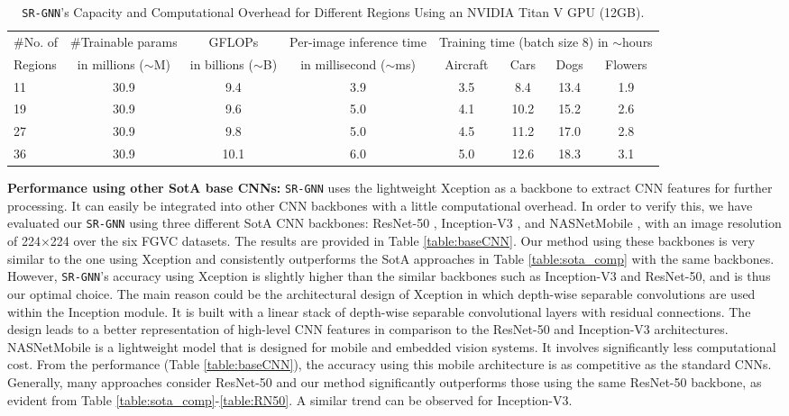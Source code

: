 \documentclass[journal]{IEEEtran}
\begin{document}
\begin{table*}[h]
\begin{center}
\caption{\texttt{SR-GNN}'s Capacity and Computational Overhead for Different Regions Using an NVIDIA Titan V GPU (12GB). }  
\label{table:time}
\begin{tabular}{|l |c |c |c |c |c |c |c|}
 \hline
\#No. of &\#Trainable params &GFLOPs &Per-image inference time  &\multicolumn{4}{|c|}{Training time (batch size 8) in $\sim$hours}\\
    \cline{5-8}
    Regions &in millions ($\sim$M) &in billions ($\sim$B) &in millisecond ($\sim$ms) &Aircraft &Cars &Dogs &Flowers \\
    \toprule
    11 &30.9 &9.4 &3.9 &3.5 &8.4 &13.4 &1.9\\
    19 &30.9 &9.6 &5.0 &4.1 &10.2 &15.2 &2.6\\
    27 &30.9 &9.8 &5.0 &4.5 &11.2 &17.0 &2.8\\
    36 &30.9 &10.1 &6.0 &5.0 &12.6 &18.3 &3.1\\
   \bottomrule
\end{tabular}
 \end{center}
 \vspace{- 0.5 cm}
\end{table*}

\noindent\textbf{Performance using other SotA base CNNs:} \texttt{SR-GNN} uses the lightweight Xception\cite{chollet2017xception} as a backbone to extract CNN features for further processing. It can easily be integrated into other CNN backbones with a little computational overhead. In order to verify this, we have evaluated our \texttt{SR-GNN} using three different SotA CNN backbones: ResNet-50 \cite{he2016deep}, Inception-V3 \cite{szegedy2016rethinking}, and NASNetMobile \cite{zoph2018learning}, with an image resolution of 224$\times$224 over the six FGVC datasets. The results are provided in Table \ref{table:baseCNN}. Our method using these backbones is very similar to the one using Xception and consistently outperforms the SotA approaches in Table \ref{table:sota_comp} with the same backbones. However, \texttt{SR-GNN}'s accuracy using Xception is slightly higher than the similar backbones such as Inception-V3 and ResNet-50, and is thus our optimal choice. The main reason could be the architectural design of Xception in which depth-wise separable convolutions are used within the Inception module. It is built with a linear stack of depth-wise separable convolutional layers with residual connections. The design leads to a better representation of high-level CNN features in comparison to the ResNet-50 and Inception-V3 architectures. NASNetMobile \cite{zoph2018learning} is a lightweight model that is designed for mobile and embedded vision systems. It involves significantly less computational cost. From the performance (Table \ref{table:baseCNN}), the accuracy using this mobile architecture is as competitive as the standard CNNs. Generally, many approaches consider ResNet-50 and our method significantly outperforms those using the same ResNet-50 backbone, as evident from Table \ref{table:sota_comp}-\ref{table:RN50}.  A similar trend can be observed for Inception-V3.
\end{document}

